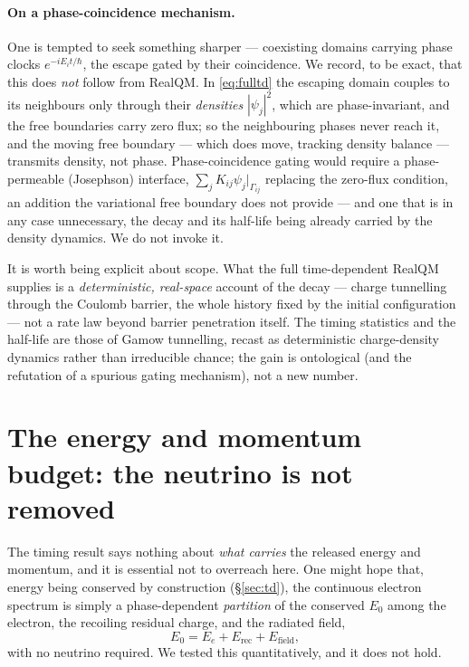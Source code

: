 \documentclass[11pt]{article}
\begin{document}
\paragraph{On a phase-coincidence mechanism.} One is tempted to seek something sharper --- coexisting
domains carrying phase clocks $e^{-iE_it/\hbar}$, the escape gated by their coincidence. We record, to be
exact, that this does \emph{not} follow from RealQM. In \eqref{eq:fulltd} the escaping domain couples to its
neighbours only through their \emph{densities} $|\psi_j|^2$, which are phase-invariant, and the free
boundaries carry zero flux; so the neighbouring phases never reach it, and the moving free boundary ---
which does move, tracking density balance --- transmits density, not phase. Phase-coincidence gating would
require a phase-permeable (Josephson) interface, $\sum_jK_{ij}\psi_j|_{\Gamma_{ij}}$ replacing the zero-flux
condition, an addition the variational free boundary does not provide --- and one that is in any case
unnecessary, the decay and its half-life being already carried by the density dynamics. We do not invoke
it.

It is worth being explicit about scope. What the full time-dependent RealQM supplies is a
\emph{deterministic, real-space} account of the decay --- charge tunnelling through the Coulomb barrier,
the whole history fixed by the initial configuration --- not a rate law beyond barrier penetration itself.
The timing statistics and the half-life are those of Gamow tunnelling, recast as deterministic
charge-density dynamics rather than irreducible chance; the gain is ontological (and the refutation of a
spurious gating mechanism), not a new number.

\section{The energy and momentum budget: the neutrino is not removed}
\label{sec:budget}

The timing result says nothing about \emph{what carries} the released energy and momentum, and it is
essential not to overreach here. One might hope that, energy being conserved by construction
(\S\ref{sec:td}), the continuous electron spectrum is simply a phase-dependent \emph{partition} of the
conserved $E_0$ among the electron, the recoiling residual charge, and the radiated field,
\begin{equation}
E_0=E_e+E_{\text{rec}}+E_{\text{field}} ,
\label{eq:partition}
\end{equation}
with no neutrino required. We tested this quantitatively, and it does not hold.
\end{document}
